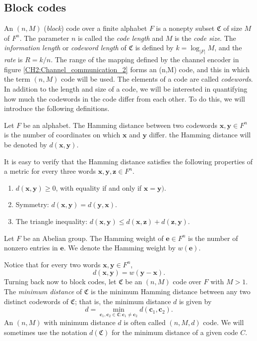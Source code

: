 \subsection{Block codes}
An $(n,M)$ (\textit{block}) code over a finite alphabet $F$ is a nonepty subset $\mathfrak{C}$ of size $M$ of $F^n$. The parameter $n$ is called the \textit{code length} and $M$ is the \textit{code size}\cite{roth_2006}. The \textit{information length} or \textit{codeword length} of $\mathfrak{C}$ is defined by $k=\log_{|F|}M$, and the \textit{rate} is $R=k/n$. The range of the mapping defined by the channel encoder in figure \ref{CH2:Channel_communication_2} forms an (n,M) code, and this in which the term $(n,M)$ code will be used. The elements of a code are called \textit{codewords}\cite{roth_2006}.\\
\indent In addition to the length and size of a code, we will be interested in quantifying how much the codewords in the code differ from each other. To do this, we will introduce the following definitions.
\begin{definition}
Let $F$ be an alphabet. The Hamming distance between two codewords $\mathbf{x},\mathbf{y}\in F^n$ is the number of coordinates on which $\mathbf{x}$ and $\mathbf{y}$ differ. the Hamming distance will be denoted by $d(\mathbf{x},\mathbf{y})$.
\end{definition}
\indent It is easy to verify that the Hamming distance satisfies the following properties of a metric for every three words $\mathbf{x},\mathbf{y},\mathbf{z}\in F^n$.
\begin{enumerate}[label=(\roman*)]
\item $d(\mathbf{x},\mathbf{y})\geq 0$, with equality if and only if $\mathbf{x}=\mathbf{y})$.
\item Symmetry: $d(\mathbf{x},\mathbf{y})=d(\mathbf{y},\mathbf{x})$.
\item The triangle inequality: $d(\mathbf{x},\mathbf{y}) \leq d(\mathbf{x},\mathbf{z})+ d(\mathbf{z},\mathbf{y})$.
\end{enumerate}
\begin{definition}
Let $F$ be an Abelian group. The Hamming weight of $\mathbf{e}\in F^n$ is the number of nonzero entries in $\mathbf{e}$. We denote the Hamming weight by $w(\mathbf{e})$.
\end{definition}
\indent Notice that for every two words $\mathbf{x}, \mathbf{y}\in F^n$,
\begin{equation}
d(\mathbf{x},\mathbf{y}) = w(\mathbf{y}-\mathbf{x}).
\end{equation}
Turning back now to block codes, let $\mathfrak{C}$ be an $(n,M)$ code over $F$ with $M>1$. The \textit{minimum distance} of $\mathfrak{C}$ is the minimum Hamming distance between any two distinct codewords of $\mathfrak{C}$; that is, the minimum distance $d$ is given by
\begin{equation}
d=\min_{\mathbf{c}_1,\mathbf{c}_2\in \mathfrak{C} : \mathbf{c}_1\neq \mathbf{c}_2} d(\mathbf{c}_1,\mathbf{c}_2).
\end{equation}
An $(n,M)$ with minimum distance $d$ is often called $(n,M,d)$ code. We will sometimes use the notation $d(\mathfrak{C})$ for the minimum distance of a given code $C$.
